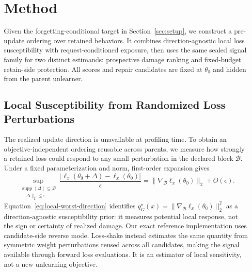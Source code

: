 
\section{Method}
\label{sec:method}

Given the forgetting-conditional target in Section~\ref{sec:setup}, we
construct a pre-update ordering over retained behaviors. It combines
direction-agnostic local loss susceptibility with request-conditioned
exposure, then uses the same sealed signal family for two distinct estimands:
prospective damage ranking and fixed-budget retain-side protection. All
scores and repair candidates are fixed at $\theta_0$ and hidden from the
parent unlearner.

\subsection{Local Susceptibility from Randomized Loss Perturbations}
\label{sec:method-gradient}
\label{sec:method-profile}

The realized update direction is unavailable at profiling time. To obtain an
objective-independent ordering reusable across parents, we measure how
strongly a retained loss could respond to any small perturbation in the
declared block $\mathcal B$. Under a fixed parameterization and norm,
first-order expansion gives
\begin{equation}
  \sup_{\substack{\operatorname{supp}(\Delta)\subseteq\mathcal B\\
                  \|\Delta\|_2\leq\epsilon}}
  \frac{|\ell_x(\theta_0+\Delta)-\ell_x(\theta_0)|}{\epsilon}
  =
  \|\nabla_{\mathcal B}\ell_x(\theta_0)\|_2+O(\epsilon).
  \label{eq:local-worst-direction}
\end{equation}
Equation~\eqref{eq:local-worst-direction} identifies
$q_G^\star(x)=\|\nabla_{\mathcal B}\ell_x(\theta_0)\|_2^2$ as a
direction-agnostic susceptibility prior: it measures potential local
response, not the sign or certainty of realized damage. Our exact reference
implementation uses candidate-side reverse mode. Loss-shake instead estimates
the same quantity from symmetric weight perturbations reused across all
candidates, making the signal available through forward loss evaluations. It
is an estimator of local sensitivity, not a new unlearning objective.

